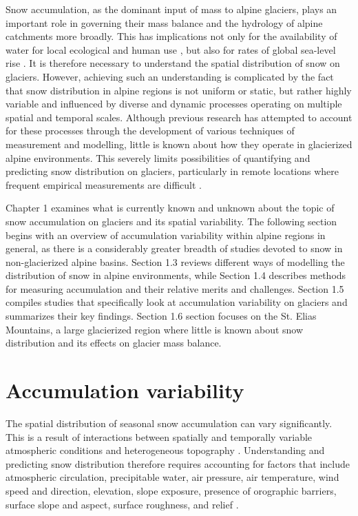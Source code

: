 \documentclass{sfuthesis}
\begin{document}
Snow accumulation, as the dominant input of mass to alpine glaciers, plays an important role in governing their mass balance and the hydrology of alpine catchments more broadly. This has implications not only for the availability of water for local ecological and human use \citep{Barnett2005,ONeel2014}, but also for rates of global sea-level rise \citep{Gardner2013}. It is therefore necessary to understand the spatial distribution of snow on glaciers. However, achieving such an understanding is complicated by the fact that snow distribution in alpine regions is not uniform or static, but rather highly variable and influenced by diverse and dynamic processes operating on multiple spatial and temporal scales. Although previous research has attempted to account for these processes through the development of various techniques of measurement and modelling, little is known about how they operate in glacierized alpine environments. This severely limits possibilities of quantifying and predicting snow distribution on glaciers, particularly in remote locations where frequent empirical measurements are difficult \citep{Nolan2015}.

Chapter 1 examines what is currently known and unknown about the topic of snow accumulation on glaciers and its spatial variability. The following section begins with an overview of accumulation variability within alpine regions in general, as there is a considerably greater breadth of studies devoted to snow in non-glacierized alpine basins. Section 1.3 reviews different ways of modelling the distribution of snow in alpine environments, while Section 1.4 describes methods for measuring accumulation and their relative merits and challenges. Section 1.5 compiles studies that specifically look at accumulation variability on glaciers and summarizes their key findings. Section 1.6 section focuses on the St. Elias Mountains, a large glacierized region where little is known about snow distribution and its effects on glacier mass balance. 

\section{Accumulation variability}

The spatial distribution of seasonal snow accumulation can vary significantly. This is a result of interactions between spatially and temporally variable atmospheric conditions and heterogeneous topography \citep{Deems2006, Liston2006}. Understanding and predicting snow distribution therefore requires accounting for factors that include atmospheric circulation, precipitable water, air pressure, air temperature, wind speed and direction, elevation, slope exposure, presence of orographic barriers, surface slope and aspect, surface roughness, and relief \citep{Schweizer2008a,McGrath2015}.
\end{document}
